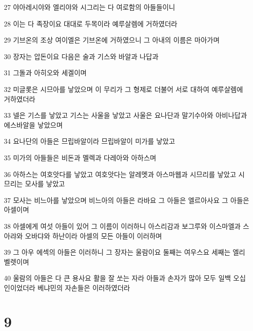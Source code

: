 \par 27 야아레시야와 엘리야와 시그리는 다 여로함의 아들들이니
\par 28 이는 다 족장이요 대대로 두목이라 예루살렘에 거하였더라
\par 29 기브온의 조상 여이엘은 기브온에 거하였으니 그 아내의 이름은 마아가며
\par 30 장자는 압돈이요 다음은 술과 기스와 바알과 나답과
\par 31 그돌과 아히오와 세겔이며
\par 32 미글롯은 시므아를 낳았으며 이 무리가 그 형제로 더불어 서로 대하여 예루살렘에 거하였더라
\par 33 넬은 기스를 낳았고 기스는 사울을 낳았고 사울은 요나단과 말기수아와 아비나답과 에스바알을 낳았으며
\par 34 요나단의 아들은 므립바알이라 므립바알이 미가를 낳았고
\par 35 미가의 아들들은 비돈과 멜렉과 다레아와 아하스며
\par 36 아하스는 여호앗다를 낳았고 여호앗다는 알레멧과 아스마웹과 시므리를 낳았고 시므리는 모사를 낳았고
\par 37 모사는 비느아를 낳았으며 비느아의 아들은 라바요 그 아들은 엘르아사요 그 아들은 아셀이며
\par 38 아셀에게 여섯 아들이 있어 그 이름이 이러하니 아스리감과 보그루와 이스마엘과 스아랴와 오바댜와 하난이라 아셀의 모든 아들이 이러하며
\par 39 그 아우 에섹의 아들은 이러하니 그 장자는 울람이요 둘째는 여우스요 세째는 엘리벨렛이며
\par 40 울람의 아들은 다 큰 용사요 활을 잘 쏘는 자라 아들과 손자가 많아 모두 일백 오십인이었더라 베냐민의 자손들은 이러하였더라

\chapter{9}

